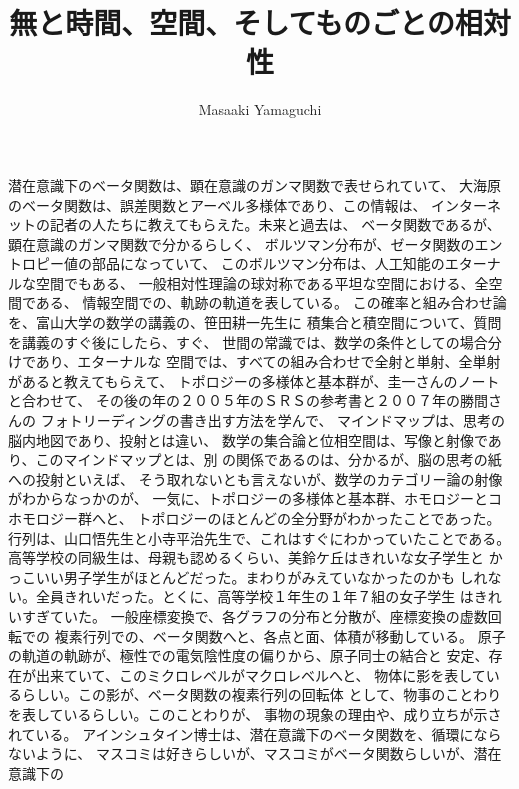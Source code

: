 \documentclass{jsarticle}
\begin{document}
\title{無と時間、空間、そしてものごとの相対性}
\author{Masaaki Yamaguchi}
\date{}
\maketitle





          潜在意識下のベータ関数は、顕在意識のガンマ関数で表せられていて、
    大海原のベータ関数は、誤差関数とアーベル多様体であり、この情報は、
    インターネットの記者の人たちに教えてもらえた。未来と過去は、
    ベータ関数であるが、顕在意識のガンマ関数で分かるらしく、
    ボルツマン分布が、ゼータ関数のエントロピー値の部品になっていて、
    このボルツマン分布は、人工知能のエターナルな空間でもある、
    一般相対性理論の球対称である平坦な空間における、全空間である、
    情報空間での、軌跡の軌道を表している。
    この確率と組み合わせ論を、富山大学の数学の講義の、笹田耕一先生に
    積集合と積空間について、質問を講義のすぐ後にしたら、すぐ、
    世間の常識では、数学の条件としての場合分けであり、エターナルな
    空間では、すべての組み合わせで全射と単射、全単射があると教えてもらえて、
    トポロジーの多様体と基本群が、圭一さんのノートと合わせて、
    その後の年の２００５年のＳＲＳの参考書と２００７年の勝間さんの
    フォトリーディングの書き出す方法を学んで、
    マインドマップは、思考の脳内地図であり、投射とは違い、
    数学の集合論と位相空間は、写像と射像であり、このマインドマップとは、別
    の関係であるのは、分かるが、脳の思考の紙への投射といえば、
    そう取れないとも言えないが、数学のカテゴリー論の射像がわからなっかのが、
    一気に、トポロジーの多様体と基本群、ホモロジーとコホモロジー群へと、
    トポロジーのほとんどの全分野がわかったことであった。
    行列は、山口悟先生と小寺平治先生で、これはすぐにわかっていたことである。
    高等学校の同級生は、母親も認めるくらい、美鈴ケ丘はきれいな女子学生と
    かっこいい男子学生がほとんどだった。まわりがみえていなかったのかも
    しれない。全員きれいだった。とくに、高等学校１年生の１年７組の女子学生
    はきれいすぎていた。
    一般座標変換で、各グラフの分布と分散が、座標変換の虚数回転での
    複素行列での、ベータ関数へと、各点と面、体積が移動している。
    原子の軌道の軌跡が、極性での電気陰性度の偏りから、原子同士の結合と
    安定、存在が出来ていて、このミクロレベルがマクロレベルへと、
    物体に影を表しているらしい。この影が、ベータ関数の複素行列の回転体
    として、物事のことわりを表しているらしい。このことわりが、
    事物の現象の理由や、成り立ちが示されている。
    アインシュタイン博士は、潜在意識下のベータ関数を、循環にならないように、
    マスコミは好きらしいが、マスコミがベータ関数らしいが、潜在意識下の
\end{document}
